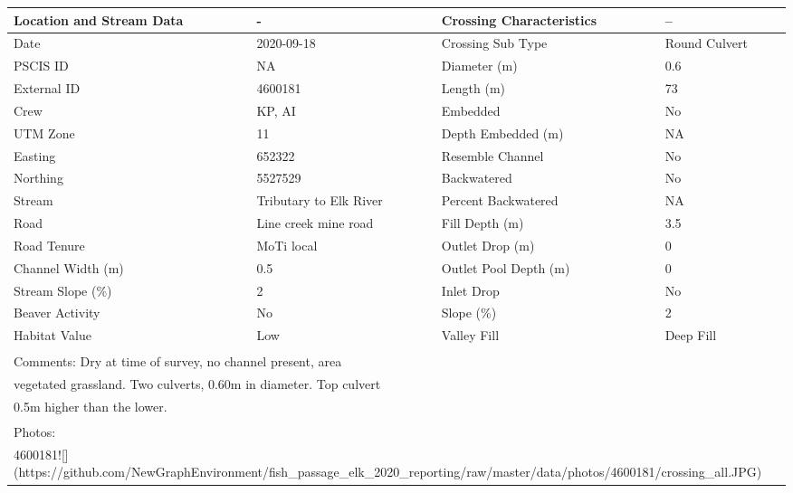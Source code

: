 \documentclass[
]{book}
\begin{document}
\begin{tabular}{l|l|l|l}
\hline
Location and Stream Data & - & Crossing Characteristics & --\\
\hline
Date & 2020-09-18 & Crossing Sub Type & Round Culvert\\
\hline
PSCIS ID & NA & Diameter (m) & 0.6\\
\hline
External ID & 4600181 & Length (m) & 73\\
\hline
Crew & KP, AI & Embedded & No\\
\hline
UTM Zone & 11 & Depth Embedded (m) & NA\\
\hline
Easting & 652322 & Resemble Channel & No\\
\hline
Northing & 5527529 & Backwatered & No\\
\hline
Stream & Tributary to Elk River & Percent Backwatered & NA\\
\hline
Road & Line creek mine road & Fill Depth (m) & 3.5\\
\hline
Road Tenure & MoTi local & Outlet Drop (m) & 0\\
\hline
Channel Width (m) & 0.5 & Outlet Pool Depth (m) & 0\\
\hline
Stream Slope (\%) & 2 & Inlet Drop & No\\
\hline
Beaver Activity & No & Slope (\%) & 2\\
\hline
Habitat Value & Low & Valley Fill & Deep Fill\\
\hline
\multicolumn{4}{l}{\textsuperscript{} Comments: Dry at time of survey, no channel present, area}\\
\multicolumn{4}{l}{vegetated grassland. Two culverts, 0.60m in diameter. Top culvert}\\
\multicolumn{4}{l}{0.5m higher than the lower.}\\
\multicolumn{4}{l}{\textsuperscript{} Photos:}\\
\multicolumn{4}{l}{4600181![](https://github.com/NewGraphEnvironment/fish\_passage\_elk\_2020\_reporting/raw/master/data/photos/4600181/crossing\_all.JPG)}\\
\end{tabular}
\end{document}
